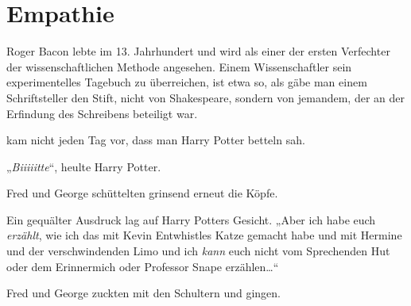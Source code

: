 \chapter{Empathie}

\begin{chapterOpeningAuthorNote}
% 
Roger Bacon lebte im 13. Jahrhundert und wird als einer der ersten Verfechter der wissenschaftlichen Methode angesehen. Einem Wissenschaftler sein experimentelles Tagebuch zu überreichen, ist etwa so, als gäbe man einem Schriftsteller den Stift, nicht von Shakespeare, sondern von jemandem, der an der Erfindung des Schreibens beteiligt war.
\end{chapterOpeningAuthorNote}

 kam nicht jeden Tag vor, dass man Harry Potter betteln sah.

\hplettrineextrapara
„\emph{Biiiiitte}“, heulte Harry Potter.

Fred und George schüttelten grinsend erneut die Köpfe.

Ein gequälter Ausdruck lag auf Harry Potters Gesicht. „Aber ich habe euch \emph{erzählt}, wie ich das mit Kevin Entwhistles Katze gemacht habe und mit Hermine und der verschwindenden Limo und ich \emph{kann} euch nicht vom Sprechenden Hut oder dem Erinnermich oder Professor Snape erzählen…“

Fred und George zuckten mit den Schultern und gingen.

